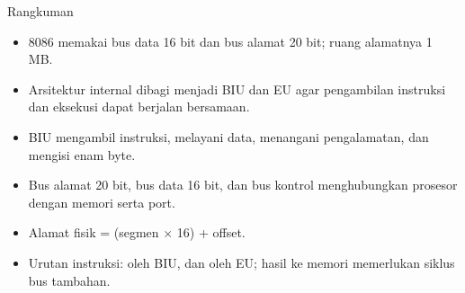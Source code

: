 \documentclass[aspectratio=169,11pt]{beamer}
\begin{document}
\begin{frame}{Rangkuman}
\small
\begin{itemize}
    \item 8086 memakai bus data 16 bit dan bus alamat 20 bit;
          ruang alamatnya 1 MB.

    \vspace{0.15em}
    \item Arsitektur internal dibagi menjadi BIU dan EU agar
          pengambilan instruksi dan eksekusi dapat berjalan
          bersamaan.

    \vspace{0.15em}
    \item BIU mengambil instruksi, melayani data, menangani
          pengalamatan, dan mengisi  enam byte.

    \vspace{0.15em}
    \item Bus alamat 20 bit, bus data 16 bit, dan bus kontrol
          menghubungkan prosesor dengan memori serta port.

    \vspace{0.15em}
    \item Alamat fisik = (segmen $\times$ 16) + offset.

    \vspace{0.15em}
    \item Urutan instruksi:  oleh BIU,  dan
           oleh EU; hasil ke memori memerlukan siklus
          bus tambahan.
\end{itemize}
\end{frame}
\end{document}
